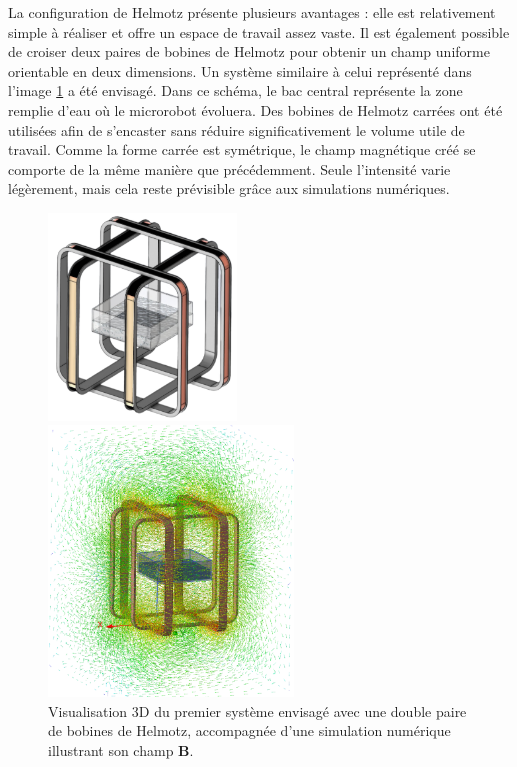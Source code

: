 \documentclass{article}
\begin{document}
\noindent
La configuration de Helmotz présente plusieurs avantages : elle est relativement simple à réaliser et offre un espace de travail assez vaste. Il est également possible de croiser deux paires de bobines de Helmotz pour obtenir un champ uniforme orientable en deux dimensions. Un système similaire à celui représenté dans l'image \ref{fig:sytèmeV1} a été envisagé. Dans ce schéma, le bac central représente la zone remplie d'eau où le microrobot évoluera. Des bobines de Helmotz carrées ont été utilisées afin de s'encaster sans réduire significativement le volume utile de travail. Comme la forme carrée est symétrique, le champ magnétique créé se comporte de la même manière que précédemment. Seule l'intensité varie légèrement, mais cela reste prévisible grâce aux simulations numériques.

    \begin{figure}[H] %
        \centering
        \begin{minipage}{0.5\textwidth}
            \centering
            \includegraphics[width=5cm]{Images/ProtoV1.png}
        \end{minipage}%
        \begin{minipage}{0.5\textwidth}
            \centering
            \includegraphics[width=6.5cm]{Images/PhotoTitreProvisoir.png}
        \end{minipage}
        \caption{Visualisation 3D du premier système envisagé avec une double paire de bobines de Helmotz, accompagnée d'une simulation numérique illustrant son champ $\mathbf{B}$.}
        \label{fig:sytèmeV1}
    \end{figure}
\end{document}
